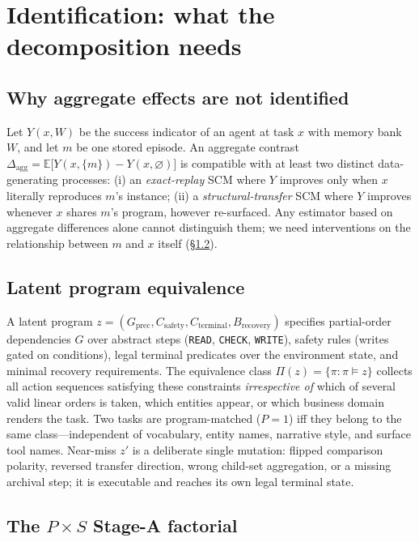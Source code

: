 \section{Identification: what the decomposition needs}
\label{sec:design}

\subsection{Why aggregate effects are not identified}

Let $Y(x,W)$ be the success indicator of an agent at task $x$ with memory bank $W$, and let $m$ be one stored episode. An aggregate contrast
$\Delta_{\mathrm{agg}} = \mathbb{E}\big[ Y(x,\{m\}) - Y(x,\varnothing) \big]$
is compatible with at least two distinct data-generating processes: (i) an \emph{exact-replay} SCM where $Y$ improves only when $x$ literally reproduces $m$'s instance; (ii) a \emph{structural-transfer} SCM where $Y$ improves whenever $x$ shares $m$'s program, however re-surfaced. Any estimator based on aggregate differences alone cannot distinguish them; we need interventions on the relationship between $m$ and $x$ itself (\S\ref{ssec:defs}).

\subsection{Latent program equivalence}\label{ssec:defs}

A latent program $z = (G_{\mathrm{prec}}, C_{\mathrm{safety}}, C_{\mathrm{terminal}}, B_{\mathrm{recovery}})$ specifies partial-order dependencies $G$ over abstract steps (\texttt{READ}, \texttt{CHECK}, \texttt{WRITE}), safety rules (writes gated on conditions), legal terminal predicates over the environment state, and minimal recovery requirements. The equivalence class
$\Pi(z) = \{ \pi : \pi \models z \}$
collects all action sequences satisfying these constraints \emph{irrespective of} which of several valid linear orders is taken, which entities appear, or which business domain renders the task. Two tasks are program-matched ($P{=}1$) iff they belong to the same class---independent of vocabulary, entity names, narrative style, and surface tool names. Near-miss $z'$ is a deliberate single mutation: flipped comparison polarity, reversed transfer direction, wrong child-set aggregation, or a missing archival step; it is executable and reaches its own legal terminal state.

\subsection{The $P\times S$ Stage-A factorial}\label{ssec:stagea}

